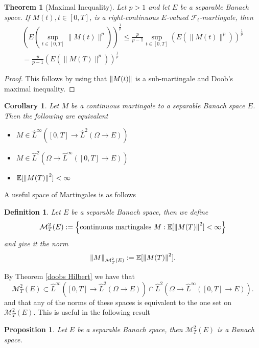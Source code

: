 \documentclass[12pt]{article}
\newtheorem{theorem}{Theorem}
\newtheorem{proposition}{Proposition}
\newtheorem{definition}{Definition}
\newtheorem{corollary}{Corollary}
\begin{document}
\begin{theorem}[Maximal Inequality]\label{doobs Hilbert} Let $p>1$ and let $E$ be a separable Banach space.
	If $M(t), t \in[0, T]$, is a right-continuous $E$-valued $\mathcal{F}_{t}$-martingale, then
	\begin{multline*}
		\left(E\left(\sup _{t \in[0, T]}\|M(t)\|^{p}\right)\right)^{\frac{1}{p}} \leq \frac{p}{p-1} \sup _{t \in[0, T]}\left(E\left(\|M(t)\|^{p}\right)\right)^{\frac{1}{p}} \\
		=\frac{p}{p-1}\left(E\left(\|M(T)\|^{p}\right)\right)^{\frac{1}{p}}
	\end{multline*}
\end{theorem}
\begin{proof}
	This follows by using that $\norm{M(t)}$ is a sub-martingale and Doob's maximal inequality.
\end{proof}
\begin{corollary}
	Let $M$ be a continuous martingale to a separable Banach space $E$. Then the following are equivalent
	\begin{itemize}
		\item $M\in \hat{L}^\infty([0,T]\to \hat{L}^2(\Omega\to E))$
		\item  $M\in \hat{L}^2(\Omega\to \hat{L}^\infty([0,T]\to E))$
		\item $\mathbb{E}[\norm{M(T)}^2]<\infty$
	\end{itemize}
\end{corollary}
A useful space of Martingales is as follows
\begin{definition}
	Let $E$ be a separable Banach space, then we define
	\begin{equation*}
		\mathcal{M}_T^2(E):=\left\{\text{continuous martingales } M:\mathbb{E}[\norm{M(T)}^2]<\infty\right\}
	\end{equation*}
	and give it the norm
	\begin{equation*}
		\norm{M}_{\mathcal{M}_T^2(E)}:=\mathbb{E}[\norm{M(T)}^2].
	\end{equation*}
\end{definition}
By Theorem \eqref{doobs Hilbert} we have that
\begin{equation*}
	\mathcal{M}_T^2(E)\subset \hat{L}^\infty([0,T]\to \hat{L}^2(\Omega\to E))\cap \hat{L}^2(\Omega\to \hat{L}^\infty([0,T]\to E)).
\end{equation*}
and that any of the norms of these spaces is equivalent to the one set on $\mathcal{M}_T^2(E)$. This is useful in the following result
\begin{proposition}
	Let $E$ be a separable Banach space, then $\mathcal{M}_T^2(E)$ is a Banach space.
\end{proposition}
\end{document}
